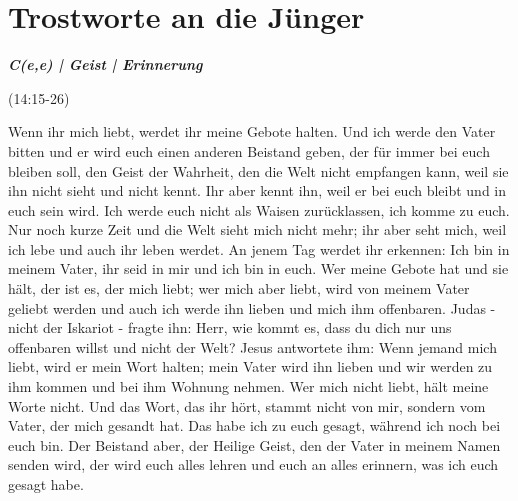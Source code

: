 
\section{Trostworte an die Jünger}

\textbf{\textit{C(e,e) | Geist | Erinnerung}}

(14:15-26)
\begin{BibelSt}
Wenn ihr mich liebt, werdet ihr meine Gebote halten. Und ich werde den Vater bitten und er wird euch einen anderen Beistand geben, der für immer bei euch bleiben soll, den Geist der Wahrheit, den die Welt nicht empfangen kann, weil sie ihn nicht sieht und nicht kennt. Ihr aber kennt ihn, weil er bei euch bleibt und in euch sein wird. Ich werde euch nicht als Waisen zurücklassen, ich komme zu euch. Nur noch kurze Zeit und die Welt sieht mich nicht mehr; ihr aber seht mich, weil ich lebe und auch ihr leben werdet. An jenem Tag werdet ihr erkennen: Ich bin in meinem Vater, ihr seid in mir und ich bin in euch. Wer meine Gebote hat und sie hält, der ist es, der mich liebt; wer mich aber liebt, wird von meinem Vater geliebt werden und auch ich werde ihn lieben und mich ihm offenbaren. Judas - nicht der Iskariot - fragte ihn: Herr, wie kommt es, dass du dich nur uns offenbaren willst und nicht der Welt? Jesus antwortete ihm: Wenn jemand mich liebt, wird er mein Wort halten; mein Vater wird ihn lieben und wir werden zu ihm kommen und bei ihm Wohnung nehmen. Wer mich nicht liebt, hält meine Worte nicht. Und das Wort, das ihr hört, stammt nicht von mir, sondern vom Vater, der mich gesandt hat.
Das habe ich zu euch gesagt, während ich noch bei euch bin. Der Beistand aber, der Heilige Geist, den der Vater in meinem Namen senden wird, der wird euch alles lehren und euch an alles erinnern, was ich euch gesagt habe.
\end{BibelSt}

